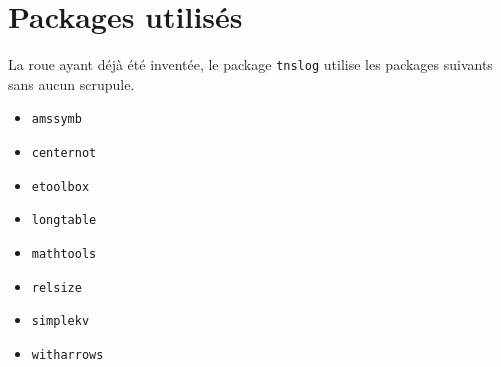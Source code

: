\documentclass[12pt,a4paper]{article}
\begin{document}
\section{Packages utilisés}

La roue ayant déjà été inventée, le package \verb#tnslog# utilise les packages suivants sans aucun scrupule.

\begin{multicols}{4}
    \begin{itemize}
        \item \verb#amssymb#
        \item \verb#centernot#
        \item \verb#etoolbox#
        \item \verb#longtable#
        \item \verb#mathtools#
        \item \verb#relsize#
        \item \verb#simplekv#
        \item \verb#witharrows#
    \end{itemize}
\end{multicols}
\end{document}
